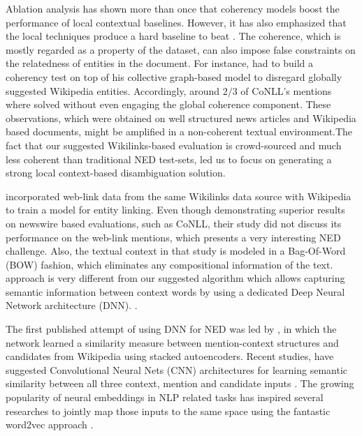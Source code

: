 \documentclass[11pt]{article}
\begin{document}
Ablation analysis has shown more than once that coherency models boost the performance of local contextual baselines. However, it has also emphasized that the local techniques produce a hard baseline to beat \cite{Ratinov2011}. The coherence, which is mostly regarded as a property of the dataset, can also impose false constraints on the relatedness of entities in the document. For instance,  had to build a coherency test on top of his collective graph-based model to disregard globally suggested Wikipedia entities. Accordingly, around $2/3$ of CoNLL's mentions where solved without even engaging the global coherence component. These observations, which were obtained on well structured news articles and Wikipedia based documents, might be amplified in a non-coherent textual environment.The fact that our suggested Wikilinks-based evaluation \cite{singh12:wiki-links} is crowd-sourced and much less coherent than traditional NED test-sets, led us to focus on generating a strong local context-based disambiguation solution.

 incorporated web-link data from the same Wikilinks data source with Wikipedia to train a model for entity linking. Even though demonstrating superior results on newswire based evaluations, such as CoNLL, their study did not discuss its performance on the web-link mentions, which presents a very interesting NED challenge. Also, the textual context in that study is modeled in a Bag-Of-Word (BOW) fashion, which eliminates any compositional information of the text.   approach is very different from our suggested algorithm which allows capturing semantic information between context words by using a dedicated Deep Neural Network architecture (DNN). .

The first published attempt of using DNN for NED was led by , in which the network learned a similarity measure between mention-context structures and candidates from Wikipedia using stacked autoencoders. Recent studies, have suggested Convolutional Neural Nets (CNN) architectures for learning semantic similarity between all three context, mention and candidate inputs \cite{sun2015modeling,francis2016capturing}. The growing popularity of neural embeddings in NLP related tasks has inspired several researches to jointly map those inputs to the same space using the fantastic word2vec approach \cite{yamada2016joint,Melamud2014}.
\end{document}
